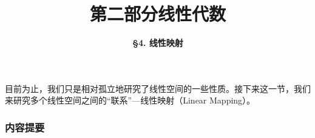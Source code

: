



\title[Linear Algebra]{\LARGE \bfseries 第二部分\quad 线性代数} %
\author[Linear Mapping] %
{\Large \bfseries \S 4. 线性映射}
\date{}






\begin{frame}

\titlepage %

\end{frame}


\begin{frame}

{\large
\hspace*{2em}目前为止，我们只是相对孤立地研究了线性空间的一些性质。接下来这一节，我们来研究多个线性空间之间的``联系''---线性映射（Linear Mapping）。
}

\end{frame}


\begin{frame}
\frametitle{内容提要} %
\tableofcontents %
\end{frame}


